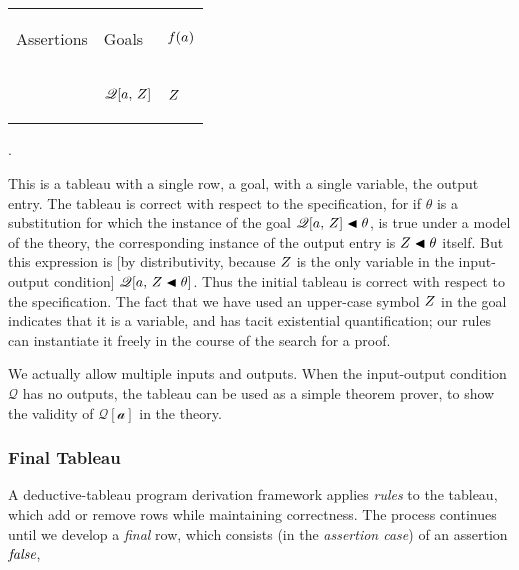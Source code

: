 \documentclass[runningheads]{llncs}
\DeclareMathOperator{\uf}{\emph{f}\,}
\begin{document}
      \begin{center}
\begin{tabular}{T}
 \hline
  \begin{center}Assertions\end{center} &  \begin{center}Goals\end{center} &  \begin{center}$\uf(a)$\end{center} \\ \hhline{|=|=|=|}
 &   \begin{center}$\mathscr{Q}[a, \, Z] $\end{center} &  \begin{center}$Z$\end{center} \\ 
 
 \hline
\end{tabular}.
\end{center}
\noindent This is a tableau with a single row, a goal, with a single variable, the output entry. The tableau is correct with respect to the specification, for if $\theta$ is a substitution for which the instance of the goal $\mathscr{Q}[a, \, Z] \blacktriangleleft \theta$,  is true under a model of the theory, the corresponding instance of the output entry is $Z \blacktriangleleft \theta$ itself. But this expression is [by distributivity, because $Z$ is the only variable in the input-output condition] $\mathscr{Q}[a, \, Z \blacktriangleleft \theta]$.  Thus the initial tableau is correct with respect to the specification. The fact that we have used an upper-case symbol $Z$ in the goal indicates that it is a variable, and has tacit existential quantification; our rules can instantiate it freely in the course of the search for a proof.


  We actually allow multiple inputs and outputs.  When the input-output condition $\mathscr{Q}$ has no outputs, the tableau can be used as a simple theorem prover, to show the validity of $\mathcal{Q[a]}$ in the theory.
   

\subsubsection{Final Tableau} A deductive-tableau program derivation framework applies \emph{rules} to the tableau, which add or remove rows while maintaining correctness.  The process continues until we develop a \emph{final} row, which consists (in the \emph{assertion case}) of an assertion $\emph{false}$,   
\end{document}
